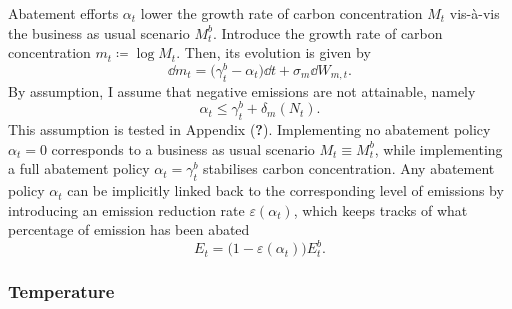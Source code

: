 \documentclass[../../main.tex]{subfiles}
\begin{document}
Abatement efforts $\alpha_t$ lower the growth rate of carbon concentration $M_t$ vis-à-vis the business as usual scenario $M^b_t$. Introduce the growth rate of carbon concentration $m_t \coloneqq  \log M_t$. Then, its evolution is given by \begin{equation} \label{eq:dynamics:carbon-concentration}
    \dd{m}_t = \big(\gamma^b_t - \alpha_t \big) \dd{t} + \sigma_m \dd{W}_{m, t}.
\end{equation} By assumption, I assume that negative emissions are not attainable, namely \begin{equation}
    \alpha_t \leq \gamma^b_t + \delta_m(N_t).
\end{equation} This assumption is tested in Appendix (\textbf{?}). \iffalse TODO: talk about this assumption further. \fi Implementing no abatement policy $\alpha_t = 0$ corresponds to a business as usual scenario $M_t \equiv M^b_t$, while implementing a full abatement policy $\alpha_t = \gamma^b_t$ stabilises carbon concentration. Any abatement policy $\alpha_t$ can be implicitly linked back to the corresponding level of emissions by introducing an emission reduction rate $\varepsilon(\alpha_t)$, which keeps tracks of what percentage of emission has been abated \begin{equation} \label{eq:emissivity}
    E_t = \big(1 - \varepsilon(\alpha_t)\big) E^b_t.
\end{equation}

\subsubsection{Temperature}
\end{document}
